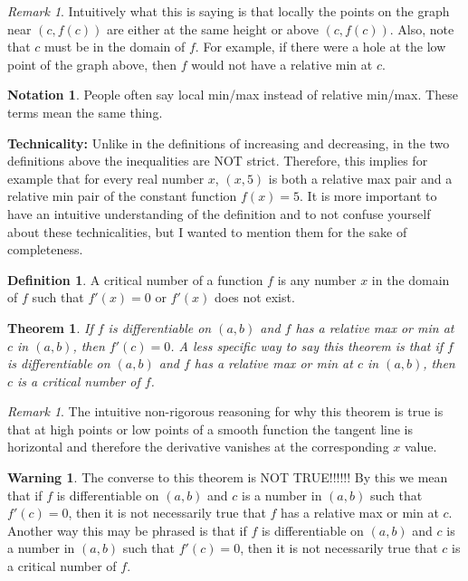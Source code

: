 \documentclass[reqno,psamsfonts]{amsart}
\newtheorem*{thmn}{Theorem}
\theoremstyle{definition}
\newtheorem*{defnn}{Definition}
\newtheorem{notn}[thm]{Notation}
\newtheorem*{warnn}{Warning}
\theoremstyle{remark}
\newtheorem{rem}[thm]{Remark}
\numberwithin{equation}{section}
\begin{document}
\begin{rem}
Intuitively what this is saying is that locally the points on the graph near $(c,f(c))$ are either at the same height or above $(c,f(c))$. Also, note that $c$ must be in the domain of $f$. For example, if there were a hole at the low point of the graph above, then $f$ would not have a relative min at $c$. 
\end{rem}

\begin{notn}
People often say local min/max instead of relative min/max. These terms mean the same thing. 
\end{notn}
\vspace{1em}

\noindent\textbf{Technicality:} Unlike in the definitions of increasing and decreasing, in the two definitions above the inequalities are NOT strict. Therefore, this implies for example that for every real number $x$, $(x,5)$ is both a relative max pair and a relative min pair of the constant function $f(x) =5$.  It is more important to have an intuitive understanding of the definition and to not confuse yourself about these technicalities, but I wanted to mention them for the sake of completeness. 

\begin{defnn}
A critical number of a function $f$ is any number $x$ in the domain of $f$ such that $f'(x)=0$ or $f'(x)$ does not exist. 
\end{defnn}

\begin{thmn}
If $f$ is differentiable on $(a, b)$ and $f$ has a relative max or min at $c$ in $(a,b)$, then $f'(c)=0$. A less specific way to say this theorem is that if $f$ is differentiable on $(a, b)$ and $f$ has a relative max or min at $c$ in $(a,b)$, then $c$ is a critical number of $f$. 
\end{thmn}

\begin{rem}
The intuitive non-rigorous reasoning for why this theorem is true is that at high points or low points of a smooth function the tangent line is horizontal and therefore the derivative vanishes at the corresponding $x$ value. 
\end{rem}

\begin{warnn}
The converse to this theorem is NOT TRUE!!!!!! By this we mean that if $f$ is differentiable on $(a,b)$ and $c$ is a number in $(a,b)$ such that $f'(c) = 0$, then it is not necessarily true that $f$ has a relative max or min at $c$. Another way this may be phrased is that if $f$ is differentiable on $(a,b)$ and $c$ is a number in $(a,b)$ such that $f'(c) = 0$, then it is not necessarily true that $c$ is a critical number of $f$.  
\end{warnn}
\end{document}
